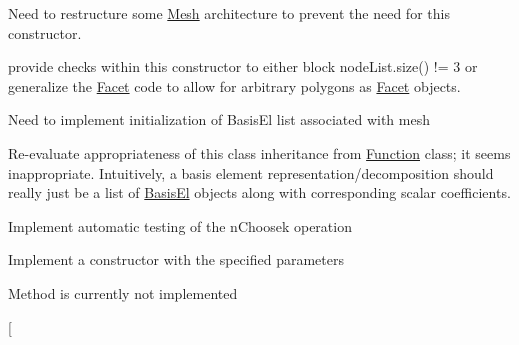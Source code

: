 
\begin{DoxyRefList}
\item[\label{todo__todo000008}%
\Hypertarget{todo__todo000008}%
Member \mbox{\hyperlink{class_facet_acfcdcc63ac32fc2a1d0378a899441bbc}{Facet\+:\+:Facet}} (double a)]Need to restructure some \mbox{\hyperlink{class_mesh}{Mesh}} architecture to prevent the need for this constructor.  
\item[\label{todo__todo000009}%
\Hypertarget{todo__todo000009}%
Member \mbox{\hyperlink{class_facet_aaecf4566bbdbfb3904d9c3ce6f7c41cf}{Facet\+:\+:Facet}} (std\+::vector$<$ Node $\ast$$>$ node\+List)]provide checks within this constructor to either block node\+List.\+size() != 3 or generalize the \mbox{\hyperlink{class_facet}{Facet}} code to allow for arbitrary polygons as \mbox{\hyperlink{class_facet}{Facet}} objects.  
\item[\label{todo__todo000001}%
\Hypertarget{todo__todo000001}%
Member \mbox{\hyperlink{class_f_e_mesh_a3d79a6cd8810a53661cea79ed1fbe922}{F\+E\+Mesh\+:\+:F\+E\+Mesh}} (std\+::string mesh\+Data\+Filename)]Need to implement initialization of Basis\+El list associated with mesh  
\item[\label{todo__todo000002}%
\Hypertarget{todo__todo000002}%
Class \mbox{\hyperlink{class_math_1_1_basis_rep}{Math\+:\+:Basis\+Rep}} ]Re-\/evaluate appropriateness of this class\textquotesingle{} inheritance from \mbox{\hyperlink{class_math_1_1_function}{Function}} class; it seems inappropriate. Intuitively, a basis element representation/decomposition should really just be a list of \mbox{\hyperlink{class_math_1_1_basis_el}{Basis\+El}} objects along with corresponding scalar coefficients.  
\item[\label{todo__todo000003}%
\Hypertarget{todo__todo000003}%
Member \mbox{\hyperlink{class_math_1_1_combinatorics_a174253b11651917aab46bc879449e59b}{Math\+:\+:Combinatorics\+:\+:testn\+Choosek}} (void)]Implement automatic testing of the n\+Choosek operation  
\item[\label{todo__todo000004}%
\Hypertarget{todo__todo000004}%
Member \mbox{\hyperlink{class_math_1_1_function_a97e51108b0374f8adc7982f92af4d0de}{Math\+:\+:Function\+:\+:Function}} ()]Implement a constructor with the specified parameters  
\item[\label{todo__todo000005}%
\Hypertarget{todo__todo000005}%
Member \mbox{\hyperlink{class_math_1_1_function_ad85e716accc64c1ea4962c828c4e216c}{Math\+:\+:Function\+:\+:integrate\+On\+Domain}} (void)]Method is currently not implemented  
\item[\label{todo__todo000006}%
$$
\end{DoxyRefList}
